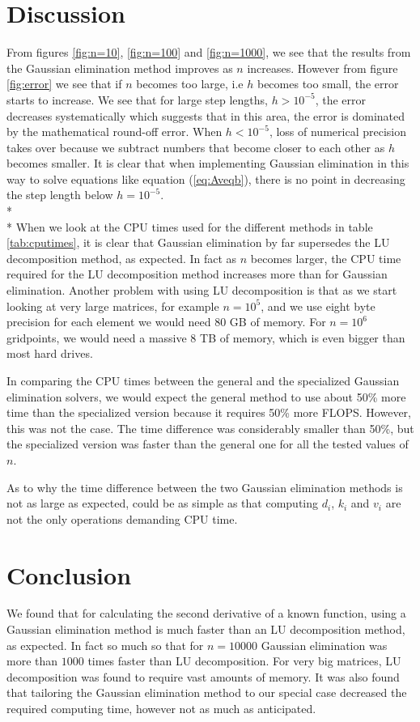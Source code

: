 \documentclass[norsk,a4paper,12pt]{article}
\begin{document}
\section{Discussion}
From figures \ref{fig:n=10}, \ref{fig:n=100} and \ref{fig:n=1000}, we see that the results from the Gaussian elimination method improves as $n$ increases. However from figure \ref{fig:error} we see that if $n$ becomes too large, i.e $h$ becomes too small, the error starts to increase. We see that for large step lengths, $h > 10^{-5}$, the error decreases systematically which suggests that in this area, the error is dominated by the mathematical round-off error. When $h < 10^{-5}$, loss of numerical precision takes over because we subtract numbers that become closer to each other as $h$ becomes smaller. It is clear that when implementing Gaussian elimination in this way to solve equations like equation (\ref{eq:Aveqb}), there is no point in decreasing the step length below $h= 10^{-5}$.
\\* \\* \noindent
When we look at the CPU times used for the different methods in table \ref{tab:cputimes}, it is clear that Gaussian elimination by far supersedes the LU decomposition method, as expected. In fact as $n$ becomes larger, the CPU time required for the LU decomposition method increases more than for Gaussian elimination. Another problem with using LU decomposition is that as we start looking at very large matrices, for example $n=10^5$, and we use eight byte precision for each element we would need $80$ GB of memory. For $n=10^6$ gridpoints, we would need a massive $8$ TB of memory, which is even bigger than most hard drives.  

In comparing the CPU times between the general and the specialized Gaussian elimination solvers, we would expect the general method to use about 50\% more time than the specialized version because it requires 50\% more FLOPS. However, this was not the case. The time difference was considerably smaller than 50\%, but the specialized version was faster than the general one for all the tested values of $n$.

As to why the time difference between the two Gaussian elimination methods is not as large as expected, could be as simple as that computing $d_i$, $k_i$ and $v_i$ are not the only operations demanding CPU time.
\section{Conclusion}
We found that for calculating the second derivative of a known function, using a Gaussian elimination method is much faster than an LU decomposition method, as expected. In fact so much so that for $n=10000$ Gaussian elimination was more than $1000$ times faster than LU decomposition. For very big matrices, LU decomposition was found to require vast amounts of memory. It was also found that tailoring the Gaussian elimination method to our special case decreased the required computing time, however not as much as anticipated. 
\end{document}
